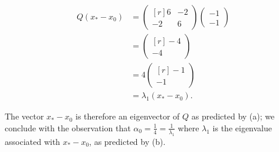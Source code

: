 \begin{solution}
    \begin{align*}
        Q(x_* - x_0) &= \begin{pmatrix*}[r]
                            6 & -2 \\
                            -2 &  6
                        \end{pmatrix*} \begin{pmatrix*}
                            -1 \\
                            -1
                        \end{pmatrix*} \\
                     &= \begin{pmatrix*}[r]
                            -4 \\
                            -4
                        \end{pmatrix*} \\
                     &= 4 \begin{pmatrix*}[r]
                            -1 \\
                            -1
                        \end{pmatrix*} \\
                     &= \lambda_1 (x_* - x_0).
    \end{align*}

    The vector $x_* - x_0$ is therefore an eigenvector of $Q$ as predicted by (a); we conclude with the observation that
    $\alpha_0 = \frac{1}{4} = \frac{1}{\lambda_1}$ where $\lambda_1$ is the eigenvalue associated with $x_* - x_0$, as 
    predicted by (b). 
    \ \\
\end{solution}